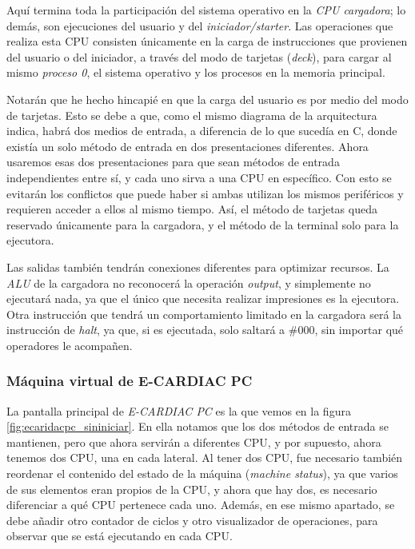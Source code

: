 \documentclass[letterpaper,12pt,oneside]{book}
\begin{document}
			
			Aquí termina toda la participación del sistema operativo en la \textit{CPU cargadora};
			lo demás, son ejecuciones del usuario y del \textit{iniciador/starter}. Las operaciones 
			que realiza esta CPU consisten únicamente en la carga de instrucciones que provienen 
			del usuario o del iniciador, a través del modo de tarjetas (\textit{deck}), para cargar al mismo 
			\textit{proceso 0}, el sistema operativo y los procesos en la memoria principal.
   
            Notarán que he hecho hincapié en que la carga del usuario es por medio del modo
			de tarjetas. Esto se debe a que, como el mismo diagrama de la arquitectura indica, 
			habrá dos medios de entrada, a diferencia de lo que sucedía
			en C, donde existía un solo
			método de entrada  en dos presentaciones diferentes. Ahora usaremos esas dos presentaciones para que sean métodos
			de entrada independientes entre sí, y cada uno sirva a una CPU en específico. Con esto se evitarán los conflictos 
			que puede haber si ambas utilizan los mismos periféricos y requieren acceder a ellos
			al mismo tiempo. Así, el método de tarjetas queda reservado únicamente para la cargadora, y el método de la terminal 
			solo para la 
			ejecutora.

            Las salidas también tendrán conexiones diferentes para optimizar recursos.
            La \textit{ALU} de la cargadora no reconocerá la operación \textit{output}, y simplemente
			no ejecutará nada, ya que el único que necesita realizar impresiones es la ejecutora. Otra instrucción que tendrá un comportamiento 
			limitado en la cargadora será la instrucción de \textit{halt}, ya que, si es ejecutada, solo saltará a \#000, sin importar
			qué operadores le acompañen.
			

			
			\subsubsection{Máquina virtual de E-CARDIAC PC}
			
			La pantalla principal de \textit{E-CARDIAC PC} es la que vemos en la figura \ref{fig:ecaridacpc_sininiciar}. En ella notamos que los 
			dos métodos	de entrada se mantienen, pero que ahora servirán a diferentes CPU, 
			y por supuesto, ahora tenemos dos CPU, una en cada lateral. Al tener dos CPU, fue necesario
			también reordenar el contenido del estado de la máquina (\textit{machine status}), ya que varios de sus elementos eran propios de la CPU, y 
			ahora que hay dos, es necesario
			diferenciar a qué CPU pertenece cada uno. Además, en ese mismo apartado, se debe añadir otro contador de ciclos y otro
			visualizador de operaciones, para observar que se está ejecutando en cada CPU.
			
\end{document}
